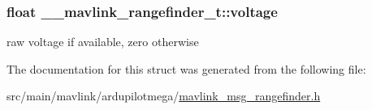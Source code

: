 \hypertarget{struct____mavlink__rangefinder__t_ace9c69fef660edd244717ac5fee4f755}{
\subsubsection[{voltage}]{\setlength{\rightskip}{0pt plus 5cm}float \+\_\+\+\_\+mavlink\+\_\+rangefinder\+\_\+t\+::voltage}}\label{struct____mavlink__rangefinder__t_ace9c69fef660edd244717ac5fee4f755}


raw voltage if available, zero otherwise 



The documentation for this struct was generated from the following file\+:\begin{DoxyCompactItemize}
\item 
src/main/mavlink/ardupilotmega/\hyperlink{mavlink__msg__rangefinder_8h}{mavlink\+\_\+msg\+\_\+rangefinder.\+h}\end{DoxyCompactItemize}
